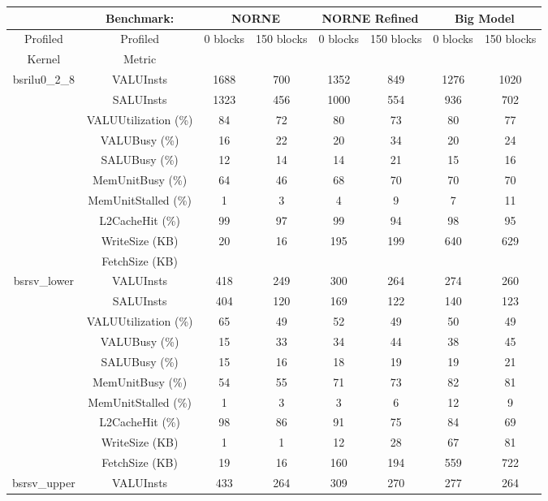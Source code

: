 \begin{table}[!h]
\centering
\begin{tabular}{c|c|c|c|c|c|c|c}
& Benchmark: & \multicolumn{2}{|c|}{NORNE} &\multicolumn{2}{|c|}{NORNE Refined} & \multicolumn{2}{|c}{Big Model} \\\hline
Profiled & Profiled & \multirow{2}{*}{0 blocks} & \multirow{2}{*}{150 blocks} & \multirow{2}{*}{0 blocks} & \multirow{2}{*}{150 blocks} & \multirow{2}{*}{0 blocks} & \multirow{2}{*}{150 blocks} \\ 
Kernel & Metric & & & & & & \\\hline\hline
\multirow{10}{*}{bsrilu0\_2\_8} & VALUInsts & 1688 & 700 & 1352 & 849 & 1276 & 1020\\
& SALUInsts   & 1323 & 456 & 1000 & 554 & 936 & 702\\
& VALUUtilization (\%)  & 84 & 72 & 80 & 73 & 80 & 77\\
& VALUBusy (\%)          & 16 & 22 & 20 & 34 & 20 & 24\\
& SALUBusy (\%)          & 12 & 14 & 14 & 21 & 15 & 16\\
& MemUnitBusy (\%)        & 64 & 46 & 68 & 70 & 70 & 70\\
& MemUnitStalled (\%)      & 1 & 3 & 4 & 9 & 7 & 11\\
& L2CacheHit (\%)  & 99 & 97 & 99 & 94 & 98 & 95\\
& WriteSize (KB)  & 20 & 16 & 195 & 199 & 640 & 629\\
& FetchSize (KB)  &  &  &  &  &  & \\\hline
\multirow{10}{*}{bsrsv\_lower} & VALUInsts & 418 & 249 & 300 & 264 & 274 & 260\\
& SALUInsts   & 404 & 120 & 169 & 122 & 140 & 123\\
& VALUUtilization (\%)  & 65 & 49 & 52 & 49 & 50 & 49\\
& VALUBusy (\%)          & 15 & 33 & 34 & 44 & 38 & 45\\
& SALUBusy (\%)          & 15 & 16 & 18 & 19 & 19 & 21\\
& MemUnitBusy (\%)        & 54 & 55 & 71 & 73 & 82 & 81\\
& MemUnitStalled (\%)      & 1 & 3 & 3 & 6 & 12 & 9\\
& L2CacheHit (\%)  & 98 & 86 & 91 & 75 & 84 & 69\\
& WriteSize (KB)  & 1 & 1 & 12 & 28 & 67 & 81\\
& FetchSize (KB)  & 19 & 16 & 160 & 194 & 559 & 722\\\hline
\multirow{10}{*}{bsrsv\_upper} & VALUInsts & 433 & 264 & 309 & 270 & 277 & 264\\

\end{tabular}
\end{table}
